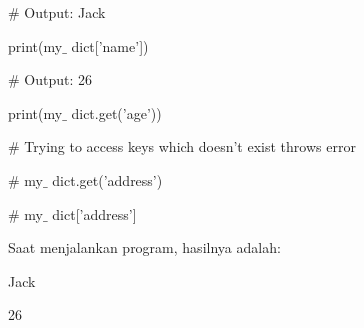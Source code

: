 \noindent \hspace*{0.5in}\hspace*{0.5in}$\#$  Output: Jack\par


\noindent \hspace*{0.5in}\hspace*{0.5in}print(my$ \_ $ dict['name'])\par


\noindent \hspace*{0.5in}\hspace*{0.5in}$\#$  Output: 26\par


\noindent \hspace*{0.5in}\hspace*{0.5in}print(my$ \_ $ dict.get('age'))\par


\noindent \hspace*{0.5in}\hspace*{0.5in}$\#$  Trying to access keys which doesn't exist throws error\par


\noindent \hspace*{0.5in}\hspace*{0.5in}$\#$  my$ \_ $ dict.get('address')\par


\noindent \hspace*{0.5in}\hspace*{0.5in}$\#$  my$ \_ $ dict['address']\par


\noindent \hspace*{0.5in}Saat menjalankan program, hasilnya adalah:\par


\noindent \hspace*{0.5in}\hspace*{0.5in}Jack\par


\noindent \hspace*{0.5in}\hspace*{0.5in}26\par


\vspace{\baselineskip}

\vspace{\baselineskip}
\vspace{\baselineskip}



